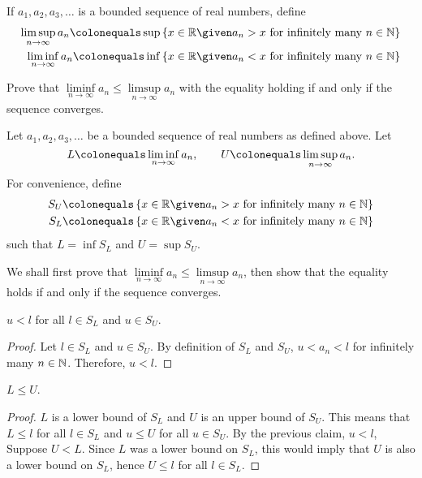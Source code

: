 \begin{problem}
  If $a_1, a_2, a_3, \ldots$ is a bounded sequence of real numbers, define
  \begin{align*}
    \limsup\limits_{n \to \infty}{a_n}
    \colonequals
    \sup \set{x \in \R \given a_n > x \text{ for infinitely many } n \in \N}
    \\
    \liminf\limits_{n \to \infty}{a_n}
    \colonequals
    \inf \set{x \in \R \given a_n < x \text{ for infinitely many } n \in \N}
  \end{align*}

  Prove that $\liminf\limits_{n \to \infty}{a_n} \leq \limsup\limits_{n \to \infty}{a_n}$
  with the equality holding if and only if the sequence converges.
\end{problem}
\begin{answer}
  Let $a_1, a_2, a_3, \ldots$ be a bounded sequence of real numbers as defined above.
  Let \[
    L \colonequals \liminf\limits_{n \to \infty}{a_n},
    \qquad
    U \colonequals \limsup\limits_{n \to \infty}{a_n}.
  \] For convenience, define
  \begin{align*}
    S_U &\colonequals \set{x \in \R \given a_n > x \text{ for infinitely many } n \in \N}
    \\
    S_L &\colonequals \set{x \in \R \given a_n < x \text{ for infinitely many } n \in \N}
  \end{align*} such that $L = \inf S_L$ and $U = \sup S_U$.

  \step
  We shall first prove that
  $\liminf\limits_{n \to \infty}{a_n} \leq \limsup\limits_{n \to \infty}{a_n}$,
  then show that the equality holds if and only if the sequence converges.

  \begin{claim}
    $u < l$ for all $l \in S_L$ and $u \in S_U$.
    \begin{proof}
      Let $l \in S_L$ and $u \in S_U$.
      By definition of $S_L$ and $S_U$,
      $u < a_n < l$ for infinitely many $n \in \mathbb{N}$.
      Therefore, $u < l$.
    \end{proof}
  \end{claim}

  \begin{claim}
    $L \leq U$.
    \begin{proof}
      $L$ is a lower bound of $S_L$ and $U$ is an upper bound of $S_U$.
      This means that $L \leq l$ for all $l \in S_L$ and $u \leq U$ for all $u \in S_U$.
      By the previous claim, $u < l$,
      Suppose $U < L$.
      Since $L$ was a lower bound on $S_L$, this would imply that
      $U$ is also a lower bound on $S_L$, hence $U \leq l$ for all $l \in S_L$.

    \end{proof}
  \end{claim}

  
\end{answer}
